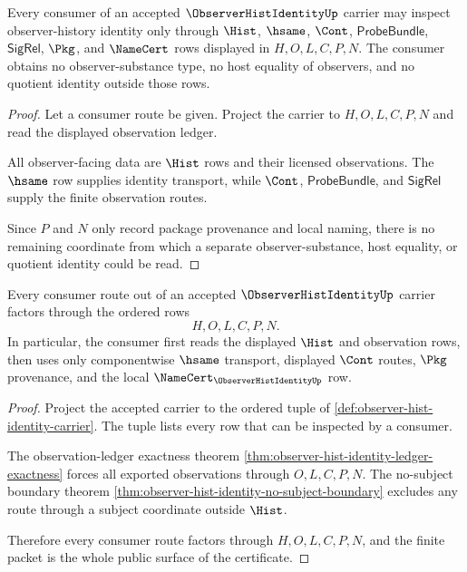 \begin{theorem}\label{thm:observer-hist-identity-no-subject-boundary}
Every consumer of an accepted $\ObserverHistIdentityUp$ carrier may inspect observer-history identity only through $\Hist$, $\hsame$, $\Cont$, $\mathsf{ProbeBundle}$, $\mathsf{SigRel}$, $\Pkg$, and $\NameCert$ rows displayed in $H,O,L,C,P,N$. The consumer obtains no observer-substance type, no host equality of observers, and no quotient identity outside those rows.
\end{theorem}
\begin{proof}
Let a consumer route be given. Project the carrier to $H,O,L,C,P,N$ and read the displayed observation ledger.

All observer-facing data are $\Hist$ rows and their licensed observations. The $\hsame$ row supplies identity transport, while $\Cont$, $\mathsf{ProbeBundle}$, and $\mathsf{SigRel}$ supply the finite observation routes.

Since $P$ and $N$ only record package provenance and local naming, there is no remaining coordinate from which a separate observer-substance, host equality, or quotient identity could be read.
\end{proof}

\begin{theorem}\label{thm:observer-hist-identity-consumer-surface}
Every consumer route out of an accepted $\ObserverHistIdentityUp$ carrier factors through the ordered rows
$$
H,O,L,C,P,N.
$$
In particular, the consumer first reads the displayed $\Hist$ and observation rows, then uses only componentwise $\hsame$ transport, displayed $\Cont$ routes, $\Pkg$ provenance, and the local $\NameCert_{\ObserverHistIdentityUp}$ row.
\end{theorem}
\begin{proof}
Project the accepted carrier to the ordered tuple of \autoref{def:observer-hist-identity-carrier}. The tuple lists every row that can be inspected by a consumer.

The observation-ledger exactness theorem \autoref{thm:observer-hist-identity-ledger-exactness} forces all exported observations through $O,L,C,P,N$. The no-subject boundary theorem \autoref{thm:observer-hist-identity-no-subject-boundary} excludes any route through a subject coordinate outside $\Hist$.

Therefore every consumer route factors through $H,O,L,C,P,N$, and the finite packet is the whole public surface of the certificate.
\end{proof}

